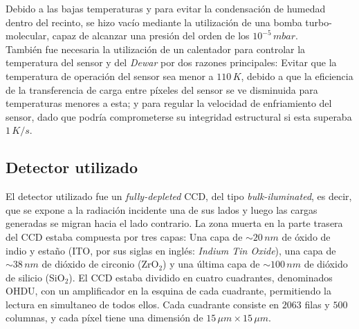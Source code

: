 Debido a las bajas temperaturas y para evitar la condensación de humedad dentro del recinto, se hizo vacío mediante la utilización de una bomba turbo-molecular, capaz de alcanzar una presión del orden de los $10^{-5}\,\si{mbar}$.\\
\indent También fue necesaria la utilización de un calentador para controlar la temperatura del sensor y del \textit{Dewar} por dos razones principales: Evitar que la temperatura de operación del sensor sea menor a $110\,\si{K}$, debido a que la eficiencia de la transferencia de carga entre píxeles del sensor se ve disminuida para temperaturas menores a esta; y para regular la velocidad de enfriamiento del sensor, dado que podría comprometerse su integridad estructural si esta superaba $1\,\si{K/s}$.\\
\subsection{Detector utilizado}
\noindent El detector utilizado fue un \textit{fully-depleted} CCD, del tipo \textit{bulk-iluminated}, es decir, que se expone a la radiación incidente una de sus lados y luego las cargas generadas se migran hacia el lado contrario. La zona muerta en la parte trasera del CCD estaba compuesta por tres capas: Una capa de $\sim 20\,\si{nm}$ de óxido de indio y estaño (ITO, por sus siglas en inglés: \textit{Indium Tin Oxide}), una capa de $\sim 38\,\si{nm}$ de dióxido de circonio (ZrO$_{2}$) y una última capa de $\sim 100\,\si{nm}$ de dióxido de silicio (SiO$_{2}$). El CCD estaba dividido en cuatro cuadrantes, denominados OHDU, con un amplificador en la esquina de cada cuadrante, permitiendo la lectura en simultaneo de todos ellos. Cada cuadrante consiste en $2063$ filas y $500$ columnas, y cada píxel tiene una dimensión de $15\,\si{\mu m} \times 15\,\si{\mu m}$.
